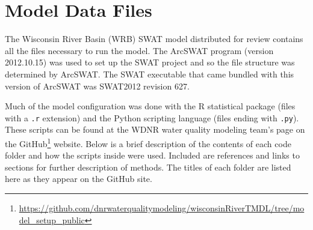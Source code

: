 \section{Model Data Files}
\label{sec:model_data}
The Wisconsin River Basin (WRB) SWAT model distributed for review contains all the files necessary to run the model. The ArcSWAT program (version 2012.10.15) was used to set up the SWAT project and so the file structure was determined by ArcSWAT. The SWAT executable that came bundled with this version of ArcSWAT was SWAT2012 revision 627.

Much of the model configuration was done with the R statistical package (files with a \texttt{.r} extension) and the Python scripting language (files ending with \texttt{.py}). These scripts can be found at the WDNR water quality modeling team's page on the GitHub\footnote{\url{https://github.com/dnrwaterqualitymodeling/wisconsinRiverTMDL/tree/model_setup_public}} website. Below is a brief description of the contents of each code folder and how the scripts inside were used. Included are references and links to sections for further description of methods. The titles of each folder are listed here as they appear on the GitHub site.

